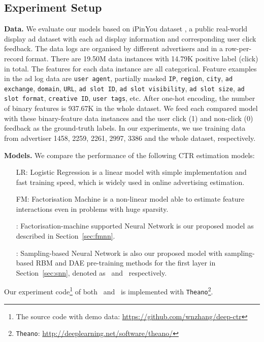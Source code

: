 \documentclass{llncs}
\newcommand{\ft}{\texttt}
\newcommand{\fmnn}{\text{FNN}}
\newcommand{\snn}{\text{SNN}}
\newcommand{\snnrbm}{\text{SNN-RBM}}
\newcommand{\snndae}{\text{SNN-DAE}}
\begin{document}
\subsection{Experiment Setup}
\textbf{Data.} We evaluate our models based on iPinYou dataset \cite{liao2014ipinyou}, a public real-world display ad dataset with each ad display information and corresponding user click feedback. The data logs are organised by different advertisers and in a row-per-record format. There are 19.50M data instances with 14.79K positive label (click) in total. The features for each data instance are all categorical. Feature examples in the ad log data are \ft{user agent}, partially masked \ft{IP}, \ft{region}, \ft{city}, \ft{ad exchange}, \ft{domain}, \ft{URL}, \ft{ad slot ID}, \ft{ad slot visibility}, \ft{ad slot size}, \ft{ad slot format}, \ft{creative ID}, \ft{user tags}, etc. After one-hot encoding, the number of binary features is 937.67K in the whole dataset. We feed each compared model with these binary-feature data instances and the user click (1) and non-click (0) feedback as the ground-truth labels. In our experiments, we use training data from advertiser 1458, 2259, 2261, 2997, 3386 and the whole dataset, respectively.





\noindent \textbf{Models.} We compare the performance of the following CTR estimation models:
\begin{itemize}
  \item [LR:] Logistic Regression \cite{richardson2007predicting} is a linear model with simple implementation and fast training speed, which is widely used in online advertising estimation.
  \item [FM:] Factorisation Machine \cite{rendle2012factorization} is a non-linear model able to estimate feature interactions even in problems with huge sparsity.
  \item [\fmnn:] Factorisation-machine supported Neural Network is our proposed model as described in Section~\ref{sec:fmnn}.
  \item [\snn:] Sampling-based Neural Network is also our proposed model with sampling-based RBM and DAE pre-training methods for the first layer in Section~\ref{sec:snn}, denoted as \snnrbm~and \snndae~respectively.
\end{itemize}
Our experiment code\footnote{The source code with demo data: \url{https://github.com/wnzhang/deep-ctr}} of both \fmnn~and \snn~is implemented with \ft{Theano}\footnote{\ft{Theano}: \url{http://deeplearning.net/software/theano/}}.
\end{document}
